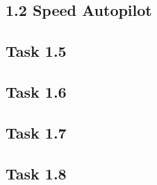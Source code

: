 \subsection*{1.2 Speed Autopilot}

\subsection*{Task 1.5}
\subsection*{Task 1.6}
\subsection*{Task 1.7}
\subsection*{Task 1.8}